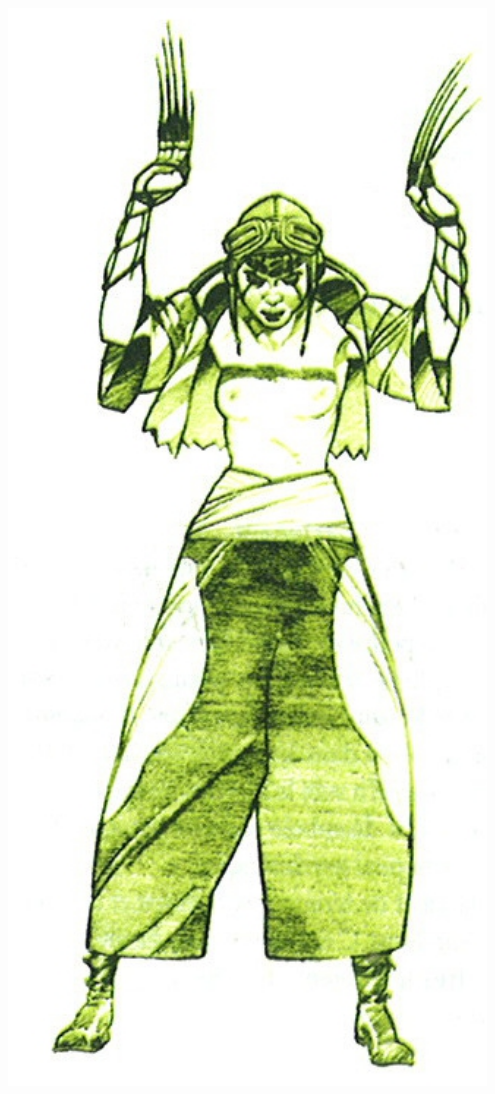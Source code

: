 \documentclass[40pt,twoside,a4paper]{article}
\begin{document}
\begin{landscape}
\begin{minipage}[ht]{0.10\textwidth}
			\includegraphics[width=0.95\textwidth]{img/personnageIrinaToss.jpg} ~\\~\\

\end{minipage}
\end{landscape}
\end{document}
